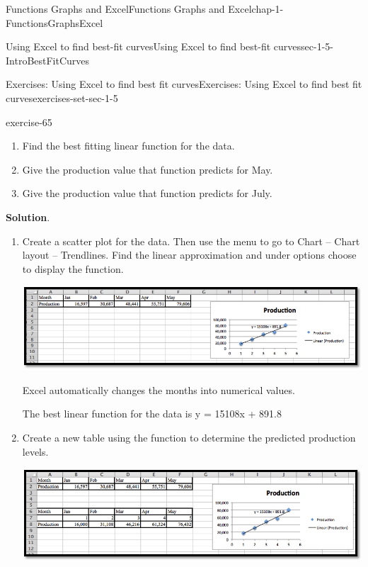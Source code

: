 \documentclass[oneside,10pt,]{book}
\numberwithin{equation}{section}
\begin{document}
\begin{chapterptx}{Functions Graphs and Excel}{}{Functions Graphs and Excel}{}{}{chap-1-FunctionsGraphsExcel}
\begin{sectionptx}{Using Excel to find best-fit curves}{}{Using Excel to find best-fit curves}{}{}{sec-1-5-IntroBestFitCurves}
\begin{exercises-subsection-numberless}{Exercises: Using Excel to find best fit curves}{}{Exercises: Using Excel to find best fit curves}{}{}{exercises-set-sec-1-5}
\begin{divisionexercise}{1}{}{}{exercise-65}
\leavevmode%
\begin{enumerate}[label=(\alph*)]
\item\hypertarget{li-109}{}\hypertarget{p-406}{}%
Find the best fitting linear function for the data.%
\item\hypertarget{li-110}{}\hypertarget{p-407}{}%
Give the production value that function predicts for May.%
\item\hypertarget{li-111}{}\hypertarget{p-408}{}%
Give the production value that function predicts for July.%
\end{enumerate}
\par\smallskip%
\noindent\textbf{Solution}.\hypertarget{solution-32}{}\quad%
\leavevmode%
\begin{enumerate}[label=(\alph*)]
\item\hypertarget{li-112}{}\hypertarget{p-409}{}%
Create a scatter plot for the data. Then use the menu to go to Chart – Chart layout – Trendlines. Find the linear approximation and under options choose to display the function. \leavevmode%
\begin{sidebyside}{1}{0}{0}{0}%
\begin{sbspanel}{1}%
\includegraphics[width=1\linewidth]{images/sec1-5-sol1a.png}
\end{sbspanel}%
\end{sidebyside}%
 Excel automatically changes the months into numerical values.%
\par
\hypertarget{p-410}{}%
The best linear function for the data is y = 15108x + 891.8%
\item\hypertarget{li-113}{}\hypertarget{p-411}{}%
Create a new table using the function to determine the predicted production levels. \leavevmode%
\begin{sidebyside}{1}{0}{0}{0}%
\begin{sbspanel}{1}%
\includegraphics[width=1\linewidth]{images/sec1-5-sol1b.png}

\end{sbspanel}
\end{sidebyside}
\end{enumerate}
\end{divisionexercise}
\end{exercises-subsection-numberless}
\end{sectionptx}
\end{chapterptx}
\end{document}
